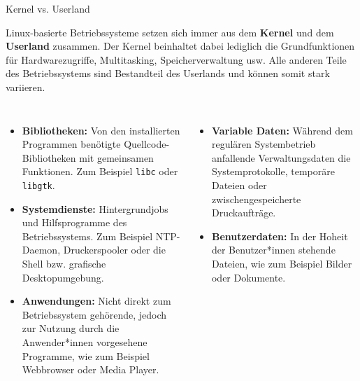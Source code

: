 {
\footnotesize
\setlength{\leftmargini}{1.2em}

\begin{frame}{Kernel vs. Userland}
    \parbox{\linewidth}{
        Linux-basierte Betriebssysteme setzen sich immer aus dem \textbf{Kernel}
        und dem \textbf{Userland} zusammen. Der Kernel beinhaltet dabei lediglich
        die Grundfunktionen für Hardwarezugriffe, Multitasking, Speicherverwaltung
        usw. Alle anderen Teile des Betriebssystems sind Bestandteil des Userlands
        und können somit stark variieren.
    }

    \vfill

    {
        \scriptsize

        \begin{columns}[T,onlytextwidth]
            \begin{itemize}
                \justifying

                \item \textbf{Bibliotheken:} Von den installierten Programmen
                benötigte Quellcode-Bibliotheken mit gemeinsamen Funktionen.
                Zum Beispiel \texttt{libc} oder \texttt{libgtk}.

                \item \textbf{Systemdienste:} Hintergrundjobs und Hilfsprogramme des
                Betriebssystems. Zum Beispiel NTP-Daemon, Druckerspooler oder die
                Shell bzw. grafische Desktopumgebung.

                \item \textbf{Anwendungen:} Nicht direkt zum Betriebssystem gehörende,
                jedoch zur Nutzung durch die Anwender*innen vorgesehene Programme, wie
                zum Beispiel Webbrowser oder Media Player.
            \end{itemize}

            \begin{itemize}
                \justifying

                \item \textbf{Variable Daten:} Während dem regulären Systembetrieb
                anfallende Verwaltungsdaten die Systemprotokolle, temporäre Dateien
                oder zwischengespeicherte Druckaufträge.

                \item \textbf{Benutzerdaten:} In der Hoheit der Benutzer*innen stehende
                Dateien, wie zum Beispiel Bilder oder Dokumente.
            \end{itemize}
        \end{columns}
    }


\end{frame}}
